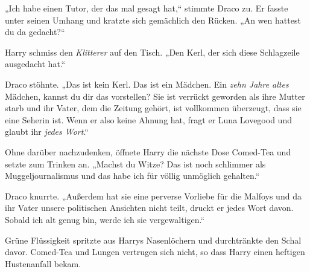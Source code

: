„Ich habe einen Tutor, der das mal gesagt hat,“ stimmte Draco zu. Er fasste unter seinen Umhang und kratzte sich gemächlich den Rücken. „An wen hattest du da gedacht?“

Harry schmiss den \emph{Klitterer} auf den Tisch. „Den Kerl, der sich diese Schlagzeile ausgedacht hat.“

Draco stöhnte. „Das ist kein Kerl. Das ist ein Mädchen. Ein \emph{zehn Jahre altes} Mädchen, kannst du dir das vorstellen? Sie ist verrückt geworden als ihre Mutter starb und ihr Vater, dem die Zeitung gehört, ist vollkommen überzeugt, dass sie eine Seherin ist. Wenn er also keine Ahnung hat, fragt er Luna Lovegood und glaubt ihr \emph{jedes Wort}.“

Ohne darüber nachzudenken, öffnete Harry die nächste Dose Comed-Tea und setzte zum Trinken an. „Machst du Witze? Das ist noch schlimmer als Muggeljournalismus und das habe ich für völlig unmöglich gehalten.“

Draco knurrte. „Außerdem hat sie eine perverse Vorliebe für die Malfoys und da ihr Vater unsere politischen Ansichten nicht teilt, druckt er jedes Wort davon. Sobald ich alt genug bin, werde ich sie vergewaltigen.“

Grüne Flüssigkeit spritzte aus Harrys Nasenlöchern und durchtränkte den Schal davor. Comed-Tea und Lungen vertrugen sich nicht, so dass Harry einen heftigen Hustenanfall bekam.

